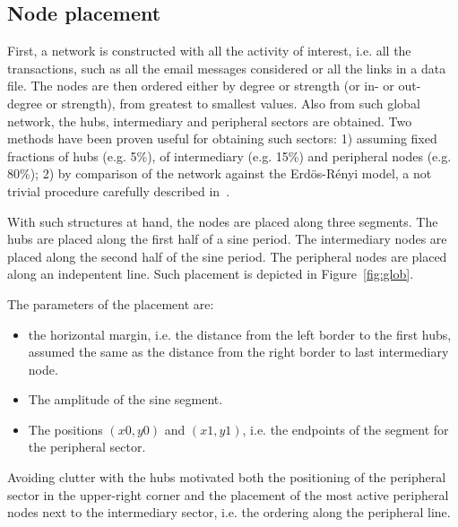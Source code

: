 \documentclass[runningheads]{llncs}
\begin{document}
\subsection{Node placement}
First, a network is constructed with all the activity of interest, i.e. all the transactions, such as all the email messages considered or all the links in a data file.
The nodes are then ordered either by degree or strength (or in- or out- degree or strength), from greatest to smallest values.
Also from such global network, the hubs, intermediary and peripheral sectors are obtained. Two methods have been proven useful for obtaining such sectors: 1) assuming fixed fractions of hubs (e.g. 5\%), of intermediary (e.g. 15\%) and peripheral nodes (e.g. 80\%); 2) by comparison of the network against the Erdös-Rényi model, a not trivial procedure carefully described in~\cite{stab}.

With such structures at hand, the nodes are placed along three segments.
The hubs are placed along the first half of a sine period.
The intermediary nodes are placed along the second half of the sine period.
The peripheral nodes are placed along an indepentent line.
Such placement is depicted in Figure~\ref{fig:glob}.


The parameters of the placement are:
\begin{itemize}
  \item the horizontal margin, i.e. the distance from the left border to the first hubs, assumed the same as the distance from the right border to last intermediary node.
  \item The amplitude of the sine segment.
  \item The positions $(x0,y0)$ and $(x1,y1)$, i.e. the endpoints of the segment for the peripheral sector.
\end{itemize}

\noindent Avoiding clutter with the hubs motivated both 
the positioning of the peripheral sector in the upper-right corner and
the placement of the most active peripheral nodes next to the intermediary sector, i.e. the ordering along the peripheral line.
\end{document}
